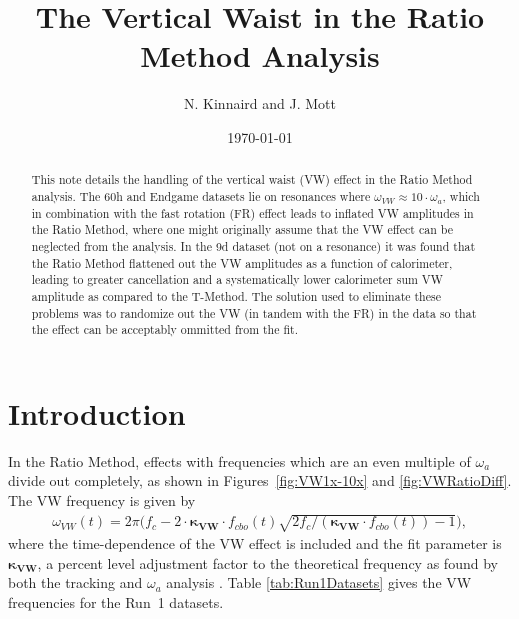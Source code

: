\documentclass[12pt,letterpaper]{article}
\title{The Vertical Waist in the Ratio Method Analysis}
\author{N. Kinnaird and J. Mott}
\date{\today}
\def\wa{$\omega_{a}$\xspace}
\begin{document}
\maketitle

\begin{abstract}
This note details the handling of the vertical waist (VW) effect in the Ratio Method analysis. The 60h and Endgame datasets lie on resonances where $\omega_{VW} \approx 10 \cdot \omega_{a}$, which in combination with the fast rotation (FR) effect leads to inflated VW amplitudes in the Ratio Method, where one might originally assume that the VW effect can be neglected from the analysis. In the 9d dataset (not on a resonance) it was found that the Ratio Method flattened out the VW amplitudes as a function of calorimeter, leading to greater cancellation and a systematically lower calorimeter sum VW amplitude as compared to the T-Method. The solution used to eliminate these problems was to randomize out the VW (in tandem with the FR) in the data so that the effect can be acceptably ommitted from the fit.
\end{abstract}


\section{Introduction}

In the Ratio Method, effects with frequencies which are an even multiple of \wa divide out completely, as shown in Figures~\ref{fig:VW1x-10x} and \ref{fig:VWRatioDiff}. The VW frequency is given by
    \begin{align} \label{eq:VWfreqKappa}
        \omega_{VW}(t) = 2\pi \Big(f_{c} - 2 \cdot \boldsymbol{\kappa_{VW}} \cdot f_{cbo}(t)\sqrt{2f_{c}/(\boldsymbol{\kappa_{VW}} \cdot f_{cbo}(t))-1}\Big),
    \end{align}
where the time-dependence of the VW effect is included and the fit parameter is $\boldsymbol{\kappa_{VW}}$, a percent level adjustment factor to the theoretical frequency as found by both the tracking and \wa analysis \cite{cbofrequency}. Table \ref{tab:Run1Datasets} gives the VW frequencies for the Run~1 datasets.
\end{document}

